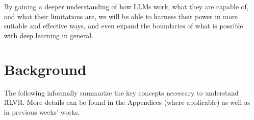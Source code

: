 \documentclass{article} %
\theoremstyle{definition}
\begin{document}
By gaining a deeper
understanding of how LLMs work, what they are capable of,
and what their limitations are, we will be able to harness their power
in more suitable and effective ways, and even expand the boundaries 
of what is possible with deep learning in general.


\section{Background}

The following informally summarize the key concepts necessary to understand
RLVR. More details can be found in the Appendices (where applicable)
as well as in previous weeks' works.
\end{document}

